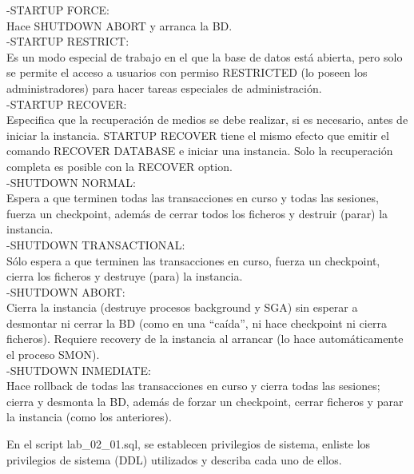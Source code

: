     -STARTUP FORCE:\\
    Hace SHUTDOWN ABORT y arranca la BD.\\
    
    -STARTUP RESTRICT:\\
    Es un modo especial de trabajo en el que la base de datos está abierta, pero solo se permite el acceso a usuarios 
    con permiso RESTRICTED (lo poseen los administradores) para hacer tareas especiales de administración.\\
    
    -STARTUP RECOVER:\\
    Especifica que la recuperación de medios se debe realizar, si es necesario, antes de iniciar la instancia. STARTUP RECOVER tiene el mismo efecto que emitir el comando RECOVER DATABASE e iniciar una instancia. Solo la recuperación completa es posible con la RECOVER option.\\
    
    -SHUTDOWN NORMAL:\\
    Espera a que terminen todas las transacciones en curso y todas las sesiones, 
    fuerza un checkpoint, además de cerrar todos los ficheros y destruir (parar) la instancia.\\
    
    -SHUTDOWN TRANSACTIONAL:\\
    Sólo espera a que terminen las transacciones en curso, fuerza un checkpoint, cierra los ficheros y destruye (para) la instancia.\\
    
    -SHUTDOWN ABORT:\\
     Cierra la instancia (destruye procesos background y SGA) sin esperar a desmontar ni cerrar la BD (como en una “caída”, ni hace checkpoint ni cierra ficheros). Requiere recovery de la instancia al arrancar (lo hace automáticamente el proceso SMON).\\

    -SHUTDOWN INMEDIATE:\\
    Hace rollback de todas las transacciones en curso y cierra todas las sesiones; cierra y desmonta la BD, además de forzar un checkpoint, cerrar ficheros y parar la instancia (como los anteriores).\\
    
   \item En el script lab_02_01.sql, se establecen privilegios de sistema, enliste los privilegios de sistema (DDL) 
   utilizados y describa cada uno de ellos.\\
   
